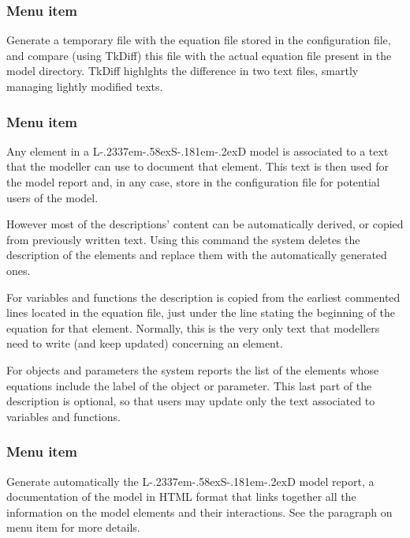 \documentclass [11pt,a4paper] {book}
\def\LsD{{L\kern-.2337em\lower-.58ex\hbox{S}\kern-.181em\lower-.2ex\hbox{D}}\xspace}
\begin{document}
\subsubsection{Menu item  }

Generate a temporary file with the equation file stored in the configuration file, and compare (using TkDiff) this file with the actual equation file present in the model directory. TkDiff highlghts the difference in two text files, smartly managing lightly modified texts.

\subsubsection{Menu item  }

Any element in a \LsD model is associated to a text that the modeller can use to document that element. This text is then used for the model report and, in any case, store in the configuration file for potential users of the model. 

However most of the descriptions' content can be automatically derived, or copied from previously written text. Using this command the system deletes the description of the elements and replace them with the automatically generated ones.

For variables and functions the description is copied from the earliest commented lines located in the equation file, just under the line stating the beginning of the equation for that element. Normally, this is the very only text that modellers need to write (and keep updated) concerning an element.

For objects and parameters the system reports the list of the elements whose equations include the label of the object or parameter. This last part of the description is optional, so that users may update only the text associated to variables and functions.

\subsubsection{Menu item  }

Generate automatically the \LsD model report, a documentation of the model in HTML format that links together all the information on the model elements and their interactions. See the paragraph on menu item  for more details.
\end{document}
